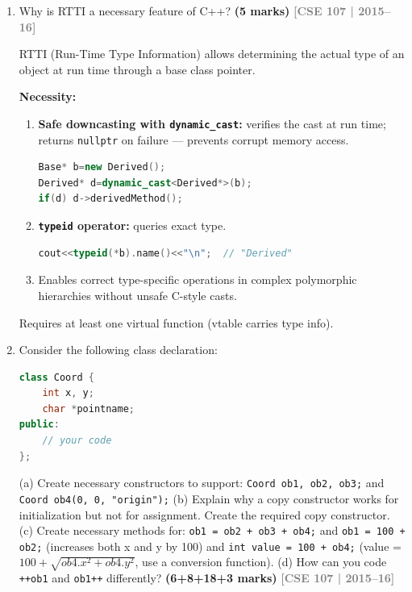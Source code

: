 \documentclass[12pt,a3paper]{article}
\newcommand{\yr}[1]{\hfill\textcolor{gray}{\small\textbf{[#1]}}}
\newcommand{\mk}[1]{\textcolor{orange!70!black}{\small\textbf{(#1 marks)}}}
\begin{document}
\begin{enumerate}
\begin{tcolorbox}[enhanced,breakable,ansbox,colback=cF!4,colframe=cF,
  boxrule=0.8pt,arc=5pt,
  title={\textbf{Answer --- Four C++ casting types with examples}},
  fonttitle=\bfseries\color{white},colbacktitle=cF]
\end{tcolorbox}

\item Why is RTTI a necessary feature of C++? \mk{5}
\yr{CSE 107 | 2015--16}


\begin{tcolorbox}[enhanced,breakable,ansbox,colback=cF!4,colframe=cF,
  boxrule=0.8pt,arc=5pt,
  title={\textbf{Answer --- Why is RTTI necessary in C++?}},
  fonttitle=\bfseries\color{white},colbacktitle=cF]

RTTI (Run-Time Type Information) allows determining the actual type
of an object at run time through a base class pointer.

\textbf{Necessity:}
\begin{enumerate}[label=\textbf{\arabic*.}]
  \item \textbf{Safe downcasting with \texttt{dynamic\_cast}:}
    verifies the cast at run time; returns \texttt{nullptr} on
    failure --- prevents corrupt memory access.
\begin{lstlisting}[language=C++]
Base* b=new Derived();
Derived* d=dynamic_cast<Derived*>(b);
if(d) d->derivedMethod();
\end{lstlisting}

  \item \textbf{\texttt{typeid} operator:} queries exact type.
\begin{lstlisting}[language=C++]
cout<<typeid(*b).name()<<"\n";  // "Derived"
\end{lstlisting}

  \item Enables correct type-specific operations in complex
    polymorphic hierarchies without unsafe C-style casts.
\end{enumerate}

Requires at least one virtual function (vtable carries type info).

\end{tcolorbox}

\item Consider the following class declaration:
\begin{lstlisting}[language=C++]
class Coord {
    int x, y;
    char *pointname;
public:
    // your code
};
\end{lstlisting}
(a) Create necessary constructors to support: \texttt{Coord ob1, ob2, ob3;} and \texttt{Coord ob4(0, 0, "origin");}
(b) Explain why a copy constructor works for initialization but not for assignment. Create the required copy constructor.
(c) Create necessary methods for: \texttt{ob1 = ob2 + ob3 + ob4;} and \texttt{ob1 = 100 + ob2;} (increases both x and y by 100) and \texttt{int value = 100 + ob4;} (value = $100 + \sqrt{ob4.x^2 + ob4.y^2}$, use a conversion function).
(d) How can you code \texttt{++ob1} and \texttt{ob1++} differently?
\mk{6+8+18+3}
\yr{CSE 107 | 2015--16}


\end{enumerate}
\end{document}
